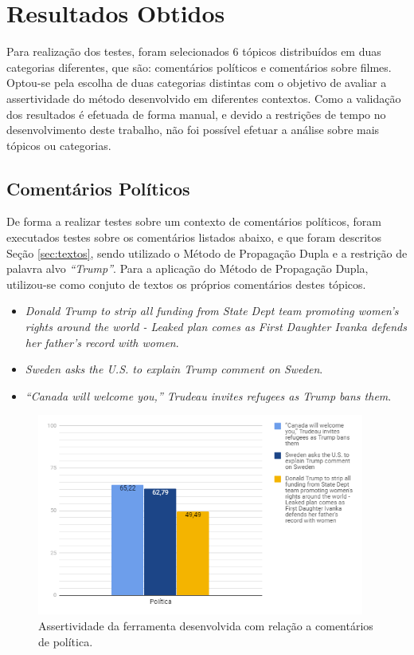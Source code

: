 \chapter{Resultados Obtidos}
\label{cap:impl}

Para realização dos testes, foram
selecionados 6 tópicos distribuídos em duas categorias diferentes, que são:
comentários políticos e comentários sobre filmes. Optou-se pela escolha de duas
categorias distintas com o objetivo de avaliar a assertividade do método
desenvolvido em diferentes contextos. Como a validação dos resultados é efetuada
de forma manual, e devido a restrições de tempo no desenvolvimento deste
trabalho, não foi possível efetuar a análise sobre mais tópicos ou categorias.

\section{Comentários Políticos}
\label{sec:pol}
De forma a realizar testes sobre um contexto de comentários políticos,
foram executados testes sobre os comentários listados abaixo, e que foram
descritos Seção \ref{sec:textos}, sendo utilizado o Método de Propagação Dupla e
a restrição de palavra alvo \textit{``Trump''}. Para a aplicação do Método de
Propagação Dupla, utilizou-se como conjuto de textos os próprios comentários
destes tópicos.

\begin{itemize}
  \item
  \textit{Donald Trump to strip all funding from State Dept team promoting
  women's rights around the world - Leaked plan comes as First Daughter Ivanka
  defends her father's record with women}.  
  \item
  \textit{Sweden asks the U.S. to explain Trump comment on
  Sweden}.
  
  \item\textit{“Canada will welcome you,” Trudeau invites refugees as Trump bans
  them}.
\end{itemize}

 
\begin{figure}[!htbp]
\centering
\includegraphics[height=250px]{imagens/politica1.png}
\caption{Assertividade da ferramenta desenvolvida com relação a comentários de
política.}
\label{fig:pol1}
\end{figure}

